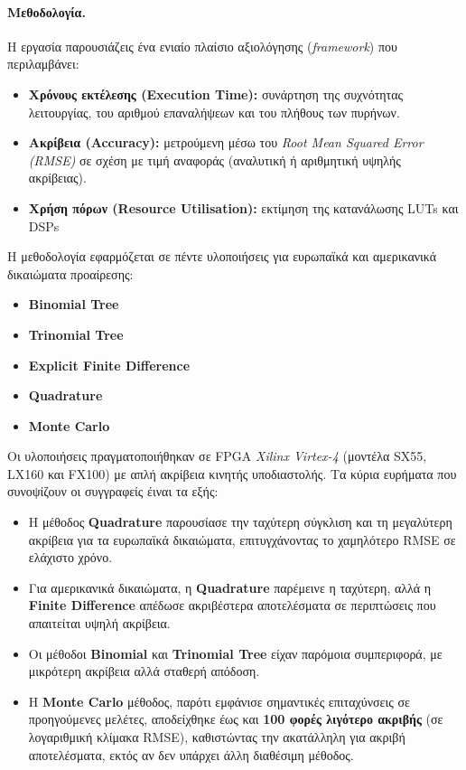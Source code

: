 \paragraph{Μεθοδολογία.}  
Η εργασία παρουσιάζεις ένα ενιαίο πλαίσιο αξιολόγησης (\textit{framework}) που περιλαμβάνει:
\begin{itemize}
  \item \textbf{Χρόνους εκτέλεσης (Execution Time):} συνάρτηση της συχνότητας λειτουργίας, του αριθμού επαναλήψεων και του πλήθους των πυρήνων.
  \item \textbf{Ακρίβεια (Accuracy):} μετρούμενη μέσω του \textit{Root Mean Squared Error (RMSE)} σε σχέση με τιμή αναφοράς (αναλυτική ή αριθμητική υψηλής ακρίβειας).
  \item \textbf{Χρήση πόρων (Resource Utilisation):} εκτίμηση της κατανάλωσης LUTs και DSPs
\end{itemize}
Η μεθοδολογία εφαρμόζεται σε πέντε υλοποιήσεις για ευρωπαϊκά και αμερικανικά δικαιώματα προαίρεσης: 
\begin{itemize}
    \item \textbf{Binomial Tree}
    \item \textbf{Trinomial Tree}
    \item \textbf{Explicit Finite Difference}
    \item \textbf{Quadrature}
    \item \textbf{Monte Carlo}
\end{itemize}

Οι υλοποιήσεις πραγματοποιήθηκαν σε FPGA \textit{Xilinx Virtex-4} (μοντέλα SX55, LX160 και FX100) με απλή ακρίβεια κινητής υποδιαστολής. Τα κύρια ευρήματα που συνοψίζουν οι συγγραφείς έιναι τα εξής:
\begin{itemize}
  \item Η μέθοδος \textbf{Quadrature} παρουσίασε την ταχύτερη σύγκλιση και τη μεγαλύτερη ακρίβεια για τα ευρωπαϊκά δικαιώματα, επιτυγχάνοντας το χαμηλότερο RMSE σε ελάχιστο χρόνο.
  \item Για αμερικανικά δικαιώματα, η \textbf{Quadrature} παρέμεινε η ταχύτερη, αλλά η \textbf{Finite Difference} απέδωσε ακριβέστερα αποτελέσματα σε περιπτώσεις που απαιτείται υψηλή ακρίβεια.
  \item Οι μέθοδοι \textbf{Binomial} και \textbf{Trinomial Tree} είχαν παρόμοια συμπεριφορά, με μικρότερη ακρίβεια αλλά σταθερή απόδοση.
  \item Η \textbf{Monte Carlo} μέθοδος, παρότι εμφάνισε σημαντικές επιταχύνσεις σε προηγούμενες μελέτες, αποδείχθηκε έως και \textbf{100 φορές λιγότερο ακριβής} (σε λογαριθμική κλίμακα RMSE),
  καθιστώντας την ακατάλληλη για ακριβή αποτελέσματα, εκτός αν δεν υπάρχει άλλη διαθέσιμη μέθοδος.
\end{itemize}

